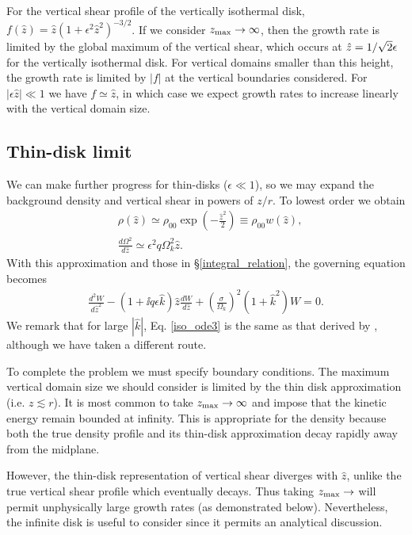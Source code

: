 For the vertical shear profile of the vertically isothermal
disk, $f(\hat{z}) =
\hat{z}\left(1+\epsilon^2\hat{z}^2\right)^{-3/2}$. If we consider
$z_\mathrm{max}\to\infty$,  then the growth rate is limited by the global
maximum of the vertical shear, which occurs at $\hat{z}
=1/\sqrt{2}\epsilon$ for the vertically isothermal disk.  
For vertical domains smaller than this height, the growth rate is
limited by $|f|$ at the vertical boundaries considered. For 
$|\epsilon\hat{z}|\ll1$ we have $f\simeq \hat{z}$, in which case we
expect growth rates to increase linearly with the vertical domain
size.  

\subsection{Thin-disk limit}
We can make further progress for thin-disks ($\epsilon\ll1$), 
so we may expand the background density and vertical shear in powers
of $z/r$. To lowest order we obtain 
\begin{align}
  &\rho(\hat{z}) \simeq \rho_{00}
  \exp{\left(-\frac{\hat{z}^2}{2}\right)} \equiv \rho_{00}w(\hat{z}),\label{thin_dens}\\
  &\frac{d\Omega^2}{d\hat{z}} \simeq \epsilon^2q\Omega_k^2\hat{z}. \label{thin_vshear}
\end{align}
With this approximation and those in \S\ref{integral_relation}, the
governing equation becomes 
\begin{align}\label{iso_ode3}
  \frac{d^2W}{d\hat{z}^2} - \left(1 + \ii q\epsilon
    \hat{k}\right)\hat{z}\frac{dW}{d\hat{z}} +
  \left(\frac{\sigma}{\Omega_k}\right)^2\left(1+\hat{k}^2\right)W = 
  0.
\end{align}
We remark that for large $|\hat{k}|$, Eq. \ref{iso_ode3} is the same as
that derived by \cite{nelson13}, although we have taken a different
route.  

To complete the problem we must specify boundary conditions. The
maximum vertical domain size we should consider is limited by the thin disk
approximation (i.e. $z\lesssim r$). It is most common to take $z_\mathrm{max}\to\infty$
and impose that the kinetic  energy remain bounded at infinity.  This
is appropriate for the density because both the true density profile
and its thin-disk approximation decay rapidly away from the midplane.   

However, the thin-disk representation of vertical shear diverges with 
$\hat{z}$, unlike the true vertical shear profile which eventually
decays.  Thus taking $z_\mathrm{max}\to$ will permit unphysically large growth
rates (as demonstrated below). Nevertheless, the infinite disk is
useful to consider since it permits an analytical discussion. 

